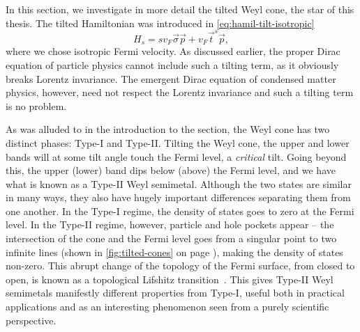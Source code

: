In this section, we investigate in more detail the tilted Weyl cone, the star of this thesis.
The tilted Hamiltonian was introduced in \cref{eq:hamil-tilt-isotropic}
\[
H_s = s v_F \vec{\sigma} \vec{p} + v_F \vec{t}^{s} \vec{p},
\]
where we chose isotropic Fermi velocity.
As discussed earlier, the proper Dirac equation of particle physics cannot include such a tilting term, as it obviously breaks Lorentz invariance.
The emergent Dirac equation of condensed matter physics, however, need not respect the Lorentz invariance and such a tilting term is no problem.
%

As was alluded to in the introduction to the section, the Weyl cone has two distinct phases: Type-I and
Type-II.
Tilting the Weyl cone, the upper and lower bands will at some tilt angle touch the Fermi level, a \emph{critical} tilt.
Going beyond this, the upper (lower) band dips below (above) the Fermi level, and we have what is known as a Type-II Weyl semimetal.
Although the two states are similar in many ways, they also have hugely important differences separating them from one another.
In the Type-I regime, the density of states goes to zero at the Fermi level.
In the Type-II regime, however, particle and hole pockets appear -- the intersection of the cone and the Fermi level goes from a singular point to two infinite lines (shown in \cref{fig:tilted-cones} on page \pageref{fig:tilted-cones}), making the density of states non-zero.
This abrupt change of the topology of the Fermi surface, from closed to open, is known as a topological Lifshitz transition~\cite{volovikTopologicalLifshitzTransitions2017}.
This gives Type-II Weyl semimetals manifestly different properties from Type-I, useful both in practical applications and as an interesting phenomenon seen from a purely scientific perspective.


